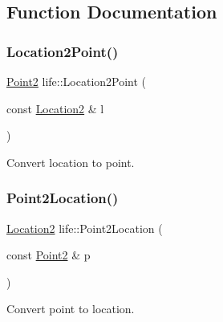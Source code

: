 \subsection{Function Documentation}
\mbox{\label{namespacelife_a2cb57fbc30678a4af892aabba49e77b4}} 
\subsubsection{\texorpdfstring{Location2Point()}{Location2Point()}}
{\footnotesize\ttfamily \mbox{\hyperlink{structlife_1_1_point2}{Point2}} life\+::\+Location2\+Point (\begin{DoxyParamCaption}\item[{const \mbox{\hyperlink{structlife_1_1_location2}{Location2}} \&}]{l }\end{DoxyParamCaption})\hspace{0.3cm}{\ttfamily [inline]}}



Convert location to point. 

\mbox{\label{namespacelife_ac4366756068df38eaa72ff9f338a55ba}} 
\subsubsection{\texorpdfstring{Point2Location()}{Point2Location()}}
{\footnotesize\ttfamily \mbox{\hyperlink{structlife_1_1_location2}{Location2}} life\+::\+Point2\+Location (\begin{DoxyParamCaption}\item[{const \mbox{\hyperlink{structlife_1_1_point2}{Point2}} \&}]{p }\end{DoxyParamCaption})\hspace{0.3cm}{\ttfamily [inline]}}



Convert point to location. 

